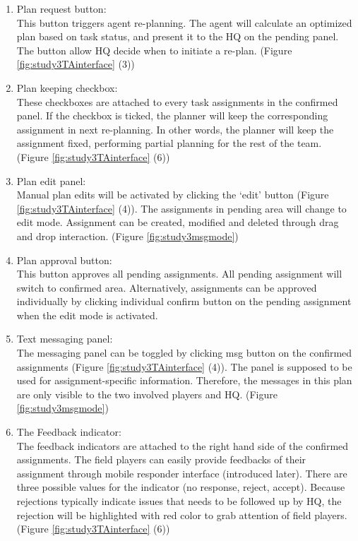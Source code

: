\begin{enumerate}
\item Plan request button: \\
This button triggers agent re-planning. The agent will calculate an optimized plan based on task status, and present it to the HQ on the pending panel. The button allow HQ decide when to initiate a re-plan. (Figure \ref{fig:study3TAinterface} (3))\\

\item Plan keeping checkbox:\\
These checkboxes are attached to every task assignments in the confirmed panel. If the checkbox is ticked, the planner will keep the corresponding assignment in next re-planning. In other words, the planner will keep the assignment fixed, performing partial planning for the rest of the team. (Figure \ref{fig:study3TAinterface} (6))

\item Plan edit panel: \\
Manual plan edits will be activated by clicking the `edit' button (Figure \ref{fig:study3TAinterface} (4)). The assignments in pending area will change to edit mode. Assignment can be created, modified and deleted through drag and drop interaction. (Figure \ref{fig:study3msgmode}) \\

\item Plan approval button: \\
This button approves all pending assignments. All pending assignment will switch to confirmed area. Alternatively, assignments can be approved individually by clicking individual confirm button on the pending assignment when the edit mode is activated. \\

\item Text messaging panel:\\
The messaging panel can be toggled by clicking msg button on the confirmed assignments (Figure \ref{fig:study3TAinterface} (4)). The panel is supposed to be used for assignment-specific information. Therefore, the messages in this plan are only visible to the two involved players and HQ. (Figure \ref{fig:study3msgmode}) \\

\item The Feedback indicator:\\
The feedback indicators are attached to the right hand side of the confirmed assignments. The field players can easily provide feedbacks of their assignment through mobile responder interface (introduced later). There are three possible values for the indicator (no response, reject, accept). Because rejections typically indicate issues that needs to be followed up by HQ, the rejection will be highlighted with red color to grab attention of field players. (Figure \ref{fig:study3TAinterface} (6))\\


\end{enumerate}

